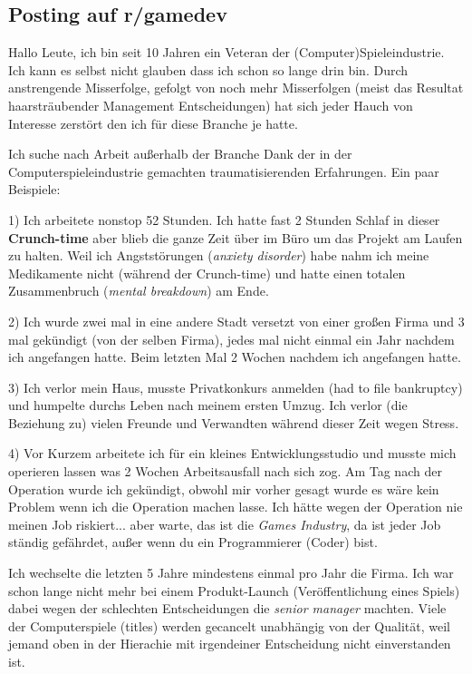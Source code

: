 \subsection*{Posting auf r/gamedev}
Hallo Leute,
ich bin seit 10 Jahren ein Veteran der (Computer)Spieleindustrie. Ich kann es selbst nicht glauben dass ich schon so lange drin bin. Durch anstrengende Misserfolge, gefolgt von noch mehr Misserfolgen (meist das Resultat haarsträubender Management Entscheidungen) hat sich jeder Hauch von Interesse zerstört den ich für diese Branche je hatte.

Ich suche nach Arbeit außerhalb der Branche Dank der in der Computerspieleindustrie gemachten traumatisierenden Erfahrungen. Ein paar Beispiele:

1) Ich arbeitete nonstop 52 Stunden. Ich hatte fast 2 Stunden Schlaf in dieser \textbf{Crunch-time} aber blieb die ganze Zeit über im Büro um das Projekt am Laufen zu halten.   
Weil ich Angststörungen (\textit{anxiety disorder}) habe nahm ich meine Medikamente nicht (während der Crunch-time) und hatte einen totalen Zusammenbruch (\textit{mental breakdown}) am Ende.

2) Ich wurde zwei mal in eine andere Stadt versetzt von einer großen Firma und 3 mal gekündigt (von der selben Firma), jedes mal nicht einmal ein Jahr nachdem ich angefangen hatte. Beim letzten Mal 2 Wochen nachdem ich angefangen hatte.

3) Ich verlor mein Haus, musste Privatkonkurs anmelden (had to file bankruptcy) und humpelte durchs Leben nach meinem ersten Umzug. Ich verlor (die Beziehung zu) vielen Freunde und Verwandten während dieser Zeit wegen Stress.

4) Vor Kurzem arbeitete ich für ein kleines Entwicklungsstudio und musste mich operieren lassen was 2 Wochen Arbeitsausfall nach sich zog. Am Tag nach der Operation wurde ich gekündigt, obwohl mir vorher gesagt wurde es wäre kein Problem wenn ich die Operation machen lasse. Ich hätte wegen der Operation nie meinen Job riskiert... aber warte, das ist die \textit{Games Industry}, da ist jeder Job ständig gefährdet, außer wenn du ein Programmierer (Coder) bist.

Ich wechselte die letzten 5 Jahre mindestens einmal pro Jahr die Firma. Ich war schon lange nicht mehr bei einem Produkt-Launch (Veröffentlichung eines Spiels) dabei wegen der schlechten Entscheidungen die \textit{senior manager} machten. Viele der Computerspiele (titles) werden gecancelt unabhängig von der Qualität, weil jemand oben in der Hierachie mit irgendeiner Entscheidung nicht einverstanden ist.

